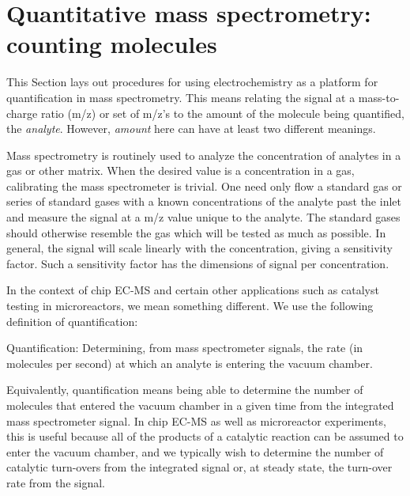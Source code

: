 

\section{Quantitative mass spectrometry: counting molecules}\label{sec:quantification}

This Section lays out procedures for using electrochemistry as a platform for quantification in mass spectrometry. This means relating the signal at a mass-to-charge ratio (m/z) or set of m/z's to the amount of the molecule being quantified, the \textit{analyte}. However, \textit{amount} here can have at least two different meanings.

Mass spectrometry is routinely used to analyze the concentration of analytes in a gas or other matrix\cite{Harris2010, Gross2007}. When the desired value is a concentration in a gas, calibrating the mass spectrometer is trivial. One need only flow a standard gas or series of standard gases with a known concentrations of the analyte past the inlet and measure the signal at a m/z value unique to the analyte. The standard gases should otherwise resemble the gas which will be tested as much as possible. In general, the signal will scale linearly with the concentration, giving a sensitivity factor. Such a sensitivity factor has the dimensions of signal per concentration.

In the context of chip EC-MS and certain other applications such as catalyst testing in microreactors, we mean something different. We use the following definition of quantification:

\begin{definition}
	Quantification: Determining, from mass spectrometer signals, the rate (in molecules per second) at which an analyte is entering the vacuum chamber. \label{d:quantification}
\end{definition} 

Equivalently, quantification means being able to determine the number of molecules that entered the vacuum chamber in a given time from the integrated mass spectrometer signal. In chip EC-MS as well as microreactor experiments, this is useful because all of the products of a catalytic reaction can be assumed to enter the vacuum chamber, and we typically wish to determine the number of catalytic turn-overs from the integrated signal or, at steady state, the turn-over rate from the signal. 


